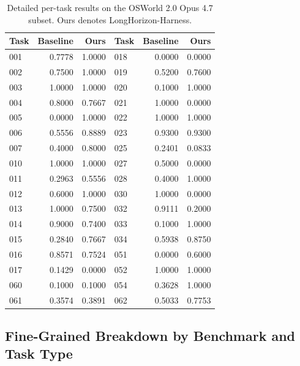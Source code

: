 \begin{table}[t]
\centering
\caption{Detailed per-task results on the OSWorld 2.0 Opus 4.7 subset. Ours denotes LongHorizon-Harness.}
\setlength{\tabcolsep}{7pt}
\begin{tabular}{lrrlrr}
\toprule
Task & Baseline & Ours & Task & Baseline & Ours \\
\midrule
001 & 0.7778 & 1.0000 & 018 & 0.0000 & 0.0000 \\
002 & 0.7500 & 1.0000 & 019 & 0.5200 & 0.7600 \\
003 & 1.0000 & 1.0000 & 020 & 0.1000 & 1.0000 \\
004 & 0.8000 & 0.7667 & 021 & 1.0000 & 0.0000 \\
005 & 0.0000 & 1.0000 & 022 & 1.0000 & 1.0000 \\
006 & 0.5556 & 0.8889 & 023 & 0.9300 & 0.9300 \\
007 & 0.4000 & 0.8000 & 025 & 0.2401 & 0.0833 \\
010 & 1.0000 & 1.0000 & 027 & 0.5000 & 0.0000 \\
011 & 0.2963 & 0.5556 & 028 & 0.4000 & 1.0000 \\
012 & 0.6000 & 1.0000 & 030 & 1.0000 & 0.0000 \\
013 & 1.0000 & 0.7500 & 032 & 0.9111 & 0.2000 \\
014 & 0.9000 & 0.7400 & 033 & 0.1000 & 1.0000 \\
015 & 0.2840 & 0.7667 & 034 & 0.5938 & 0.8750 \\
016 & 0.8571 & 0.7524 & 051 & 0.0000 & 0.6000 \\
017 & 0.1429 & 0.0000 & 052 & 1.0000 & 1.0000 \\
060 & 0.1000 & 0.1000 & 054 & 0.3628 & 1.0000 \\
061 & 0.3574 & 0.3891 & 062 & 0.5033 & 0.7753 \\
\bottomrule
\end{tabular}

\label{tab:osworld-opus47-detailed}
\end{table}

\subsection{Fine-Grained Breakdown by Benchmark and Task Type}
\label{app:fine-grained-breakdown}

